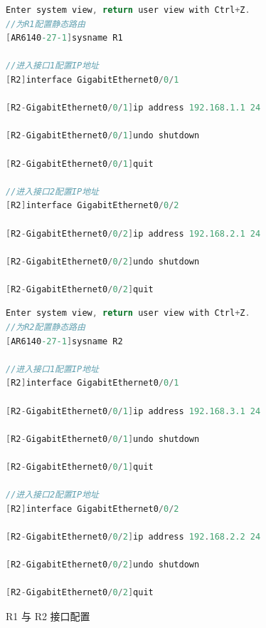 \documentclass[a4paper]{article}
\begin{document}
\begin{figure}[H]
  \centering
  \begin{minipage}[t]{0.48\textwidth}
    \begin{lstlisting}[language=C, xleftmargin=0pt]
Enter system view, return user view with Ctrl+Z.
//为R1配置静态路由
[AR6140-27-1]sysname R1

//进入接口1配置IP地址
[R2]interface GigabitEthernet0/0/1

[R2-GigabitEthernet0/0/1]ip address 192.168.1.1 24

[R2-GigabitEthernet0/0/1]undo shutdown

[R2-GigabitEthernet0/0/1]quit

//进入接口2配置IP地址
[R2]interface GigabitEthernet0/0/2

[R2-GigabitEthernet0/0/2]ip address 192.168.2.1 24

[R2-GigabitEthernet0/0/2]undo shutdown

[R2-GigabitEthernet0/0/2]quit
    \end{lstlisting}
  \end{minipage}\hfill
  \begin{minipage}[t]{0.48\textwidth}
    \begin{lstlisting}[language=C, xleftmargin=0pt]
Enter system view, return user view with Ctrl+Z.
//为R2配置静态路由
[AR6140-27-1]sysname R2

//进入接口1配置IP地址
[R2]interface GigabitEthernet0/0/1

[R2-GigabitEthernet0/0/1]ip address 192.168.3.1 24

[R2-GigabitEthernet0/0/1]undo shutdown

[R2-GigabitEthernet0/0/1]quit

//进入接口2配置IP地址
[R2]interface GigabitEthernet0/0/2

[R2-GigabitEthernet0/0/2]ip address 192.168.2.2 24

[R2-GigabitEthernet0/0/2]undo shutdown

[R2-GigabitEthernet0/0/2]quit
    \end{lstlisting}
  \end{minipage}
  \caption{R1 与 R2 接口配置}
\end{figure}
\end{document}
